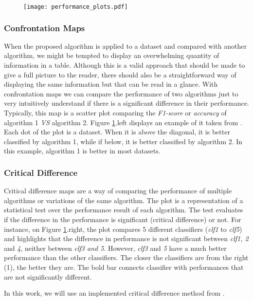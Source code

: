 \begin{figure}
\texttt{[image: performance\_plots.pdf]}
\label{fig:performance_plots}
\end{figure}

\subsubsection{Confrontation Maps}

When the proposed algorithm is applied to a dataset and compared with another algorithm, we might be tempted to display an overwhelming quantity of information in a table. Although this is a valid approach that should be made to give a full picture to the reader, there should also be a straightforward way of displaying the same information but that can be read in a glance. With confrontation maps we can compare the performance of two algorithms just to very intuitively understand if there is a significant difference in their performance. Typically, this map is a scatter plot comparing the \textit{F1-score} or \textit{accuracy} of algorithm 1 \textit{VS} algorithm 2. Figure \ref{fig:performance_plots}.left displays an example of it taken from \cite{keogh_presentation}. Each dot of the plot is a dataset. When it is above the diagonal, it is better classified by algorithm 1, while if below, it is better classified by algorithm 2. In this example, algorithm 1 is better in most datasets.

\subsubsection{Critical Difference}

Critical difference maps are a way of comparing the performance of multiple algorithms or variations of the same algorithm. The plot is a representation of a statistical test over the performance result of each algorithm. The test evaluates if the difference in the performance is significant (critical difference) or not. For instance, on Figure \ref{fig:performance_plots}.right, the plot compares 5 different classifiers (\textit{clf1} to \textit{clf5}) and highlights that the difference in performance is not significant between \textit{clf1, 2} and \textit{4}, neither between \textit{clf3 and 5}. However, \textit{clf3} and \textit{5} have a much better performance than the other classifiers. The closer the classifiers are from the right (1), the better they are. The bold bar connects classifier with performances that are not significantly different.
\par
In this work, we will use an implemented critical difference method from \cite{critical_dif}.

